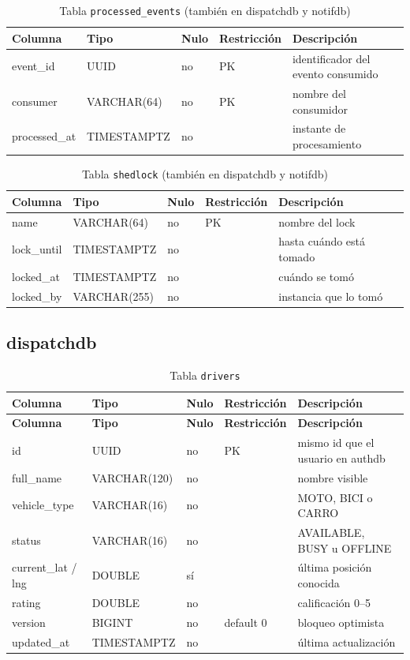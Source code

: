 \documentclass[10pt,letterpaper,twocolumn,oneside]{report}
\newcommand{\pkg}[1]{\texttt{#1}}
\begin{document}
\begin{longtable}{@{}L{3.2cm}L{3.2cm}L{1.1cm}L{3.4cm}L{3.9cm}@{}}
\caption{Tabla \pkg{processed\_events} (también en dispatchdb y notifdb)}\\
\toprule
\textbf{Columna} & \textbf{Tipo} & \textbf{Nulo} & \textbf{Restricción} & \textbf{Descripción}\\
\midrule
\endhead
event\_id & UUID & no & PK & identificador del evento consumido\\
consumer & VARCHAR(64) & no & PK & nombre del consumidor\\
processed\_at & TIMESTAMPTZ & no & & instante de procesamiento\\
\bottomrule
\end{longtable}

\begin{longtable}{@{}L{3.2cm}L{3.2cm}L{1.1cm}L{3.4cm}L{3.9cm}@{}}
\caption{Tabla \pkg{shedlock} (también en dispatchdb y notifdb)}\\
\toprule
\textbf{Columna} & \textbf{Tipo} & \textbf{Nulo} & \textbf{Restricción} & \textbf{Descripción}\\
\midrule
\endhead
name & VARCHAR(64) & no & PK & nombre del lock\\
lock\_until & TIMESTAMPTZ & no & & hasta cuándo está tomado\\
locked\_at & TIMESTAMPTZ & no & & cuándo se tomó\\
locked\_by & VARCHAR(255) & no & & instancia que lo tomó\\
\bottomrule
\end{longtable}

\subsection{dispatchdb}

\begin{longtable}{@{}L{3.2cm}L{3.2cm}L{1.1cm}L{3.4cm}L{3.9cm}@{}}
\caption{Tabla \pkg{drivers}}\\
\toprule
\textbf{Columna} & \textbf{Tipo} & \textbf{Nulo} & \textbf{Restricción} & \textbf{Descripción}\\
\midrule
\endfirsthead
\toprule
\textbf{Columna} & \textbf{Tipo} & \textbf{Nulo} & \textbf{Restricción} & \textbf{Descripción}\\
\midrule
\endhead
id & UUID & no & PK & mismo id que el usuario en authdb\\
full\_name & VARCHAR(120) & no & & nombre visible\\
vehicle\_type & VARCHAR(16) & no & & MOTO, BICI o CARRO\\
status & VARCHAR(16) & no & & AVAILABLE, BUSY u OFFLINE\\
current\_lat / lng & DOUBLE & sí & & última posición conocida\\
rating & DOUBLE & no & & calificación 0–5\\
version & BIGINT & no & default 0 & bloqueo optimista\\
updated\_at & TIMESTAMPTZ & no & & última actualización\\
\bottomrule
\end{longtable}
\end{document}
